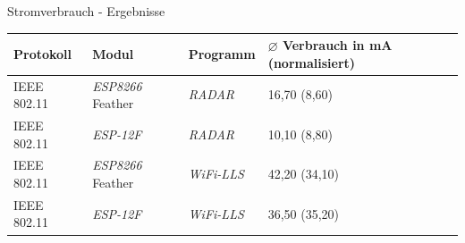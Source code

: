 \documentclass[18pt]{beamer}
\begin{document}
\begin{frame}{Stromverbrauch - Ergebnisse}
	\begin{tabular}{l|l|l|R{2.5cm}}
		Protokoll & Modul & Programm  & $\varnothing$ Verbrauch in mA (normalisiert)\\
		\hline
		IEEE 802.11 & \emph{ESP8266} Feather & \emph{RADAR} & 16,70 (8,60)\\
		IEEE 802.11 & \emph{ESP-12F} & \emph{RADAR} & 10,10 (8,80) \\
		\hline
		IEEE 802.11 & \emph{ESP8266} Feather & \emph{WiFi-LLS} & 42,20 (34,10)\\
		IEEE 802.11 & \emph{ESP-12F} & \emph{WiFi-LLS} & 36,50 (35,20)\\
	\end{tabular}
\end{frame}
\end{document}
